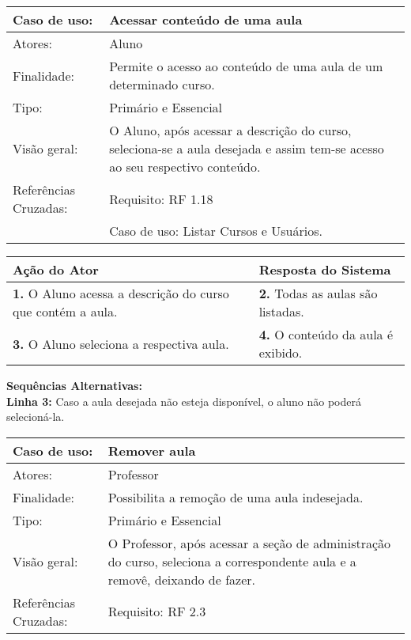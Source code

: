 \documentclass[12pt,a4paper,onecolumn,titlepage]{article}
\begin{document}
\begin{table}[h!]
\begin{center}
\begin{tabular}{p{2.5cm} p{9.5cm}}
Caso de uso: & \textbf{Acessar conteúdo de uma aula} \\ \hline
Atores: & Aluno \\ \hline
Finalidade: & Permite o acesso ao conteúdo de uma aula de um determinado curso. \\ \hline
Tipo: & Primário e Essencial\\ \hline
Visão geral: & O Aluno, após acessar a descrição do curso, seleciona-se a aula desejada e assim tem-se acesso ao seu respectivo conteúdo. \\ \hline
Referências Cruzadas: & Requisito: RF 1.18 \\ & Caso de uso: Listar Cursos e Usuários.

\end{tabular}
\end{center}
\end{table}

\begin{center}
\def\arraystretch{1.1}
\begin{tabular}{|p{6cm}|p{6cm}|}

\hline
\textbf{Ação do Ator} & \textbf{Resposta do Sistema} \\ \hline
\textbf{1.} O Aluno acessa a descrição do curso que contém a aula.  & \textbf{2.} Todas as aulas são listadas.\\ \hline
\textbf{3.} O Aluno seleciona a respectiva aula.  & \textbf{4.} O conteúdo da aula é exibido. \\ \hline
\end{tabular}
\end{center}

\textbf{Sequências Alternativas:} \\
\textbf{Linha 3:} Caso a aula desejada não esteja disponível, o aluno não poderá selecioná-la.

\newpage

\begin{table}[h!]
\begin{center}
\begin{tabular}{p{2.5cm} p{9.5cm}}
Caso de uso: & \textbf{Remover aula} \\ \hline
Atores: & Professor \\ \hline
Finalidade: & Possibilita a remoção de uma aula indesejada. \\ \hline
Tipo: & Primário e Essencial\\ \hline
Visão geral: & O Professor, após acessar a seção de administração do curso, seleciona a correspondente aula e a removê, deixando de fazer. \\ \hline
Referências Cruzadas: & Requisito: RF 2.3

\end{tabular}
\end{center}
\end{table}
\end{document}
